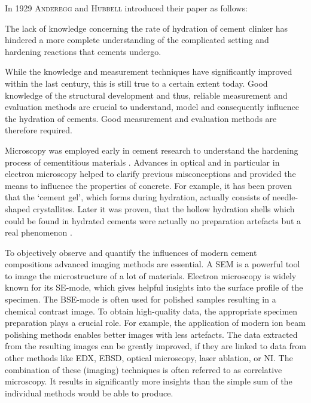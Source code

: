 In 1929 \textsc{Anderegg} and \textsc{Hubbell} introduced their paper \cite{anderegg.1929} as follows:
\begin{iquote}
	The lack of knowledge concerning the rate of hydration of cement clinker has hindered a more complete understanding of the complicated setting and hardening reactions that cements undergo. 
\end{iquote}


While the knowledge and measurement techniques have significantly improved within the last century, this is still true to a certain extent today.
Good knowledge of the structural development and thus, reliable measurement and evaluation methods are crucial to understand, model \cite{nguyen-tuan.2023,nguyen-tuan.2024,nguyen-tuan.2026,sac-morane.2026} and consequently influence the hydration of cements.
Good measurement and evaluation methods are therefore required.

Microscopy was employed early in cement research to understand the hardening process of cementitious materials \cite{anderegg.1929}.
Advances in optical and in particular in electron microscopy helped to clarify previous misconceptions and provided the means to influence the properties of concrete. 
For example, it has been proven that the `cement gel', which forms during hydration, actually consists of needle-shaped crystallites.
Later it was proven, that the hollow hydration shells which could be found in hydrated cements \cite{hadley.1972} were actually no preparation artefacts but a real phenomenon \cite{barnes.1978}.

To objectively observe and quantify the influences of modern cement compositions advanced imaging methods are essential.
A \ac{SEM} is a powerful tool to image the microstructure of a lot of materials.
Electron microscopy is widely known for its \ac{SE}-mode, which gives helpful insights into the surface profile of the specimen.
The \ac{BSE}-mode is often used for polished samples resulting in a chemical contrast image.
To obtain high-quality data, the appropriate specimen preparation plays a crucial role.
For example, the application of modern ion beam polishing methods enables better images with less artefacts.
The data extracted from the resulting images can be greatly improved, if they are linked to data from other methods like \ac{EDX}, \ac{EBSD}, optical microscopy, laser ablation, or \ac{NI}.
The combination of these (imaging) techniques is often referred to as correlative microscopy.
It results in significantly more insights than the simple sum of the individual methods would be able to produce.

